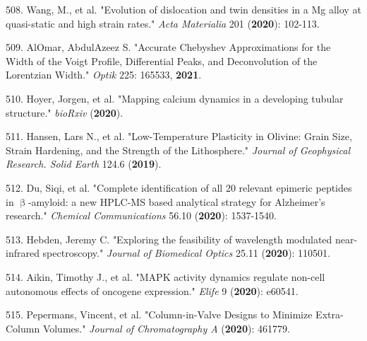 508. Wang, M., et al. "Evolution of dislocation and twin densities in a Mg alloy at quasi-static and high strain rates." \textit{Acta Materialia} 201 (\textbf{2020}): 102-113.

509. AlOmar, AbdulAzeez S. "Accurate Chebyshev Approximations for the Width of the Voigt Profile, Differential Peaks, and Deconvolution of the Lorentzian Width." \textit{Optik} 225: 165533, \textbf{2021}.

510. Hoyer, Jorgen, et al. "Mapping calcium dynamics in a developing tubular structure." \textit{bioRxiv} (\textbf{2020}).

511. Hansen, Lars N., et al. "Low-Temperature Plasticity in Olivine: Grain Size, Strain Hardening, and the Strength of the Lithosphere." \textit{Journal of Geophysical Research. Solid Earth} 124.6 (\textbf{2019}).

512. Du, Siqi, et al. "Complete identification of all 20 relevant epimeric peptides in ${\upbeta}$-amyloid: a new HPLC-MS based analytical strategy for Alzheimer's research." \textit{Chemical Communications} 56.10 (\textbf{2020}): 1537-1540.

513. Hebden, Jeremy C. "Exploring the feasibility of wavelength modulated near-infrared spectroscopy." \textit{Journal of Biomedical Optics} 25.11 (\textbf{2020}): 110501.

514. Aikin, Timothy J., et al. "MAPK activity dynamics regulate non-cell autonomous effects of oncogene expression." \textit{Elife} 9 (\textbf{2020}): e60541.

515. Pepermans, Vincent, et al. "Column-in-Valve Designs to Minimize Extra-Column Volumes." \textit{Journal of Chromatography A} (\textbf{2020}): 461779.
